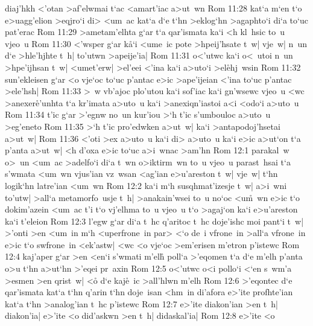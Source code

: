 diaj'hkh
<'otan
>af'elwmai
t`ac
<amart'iac
a>ut~wn\bibvsend
\vs Rom 11:28
kat`a
m`en
t`o
e>uagg'elion
>eqjro`i
di>
<um~ac
kat`a
d`e
t`hn
>eklog`hn
>agaphto`i
di`a
to`uc
pat'erac\bibvsend
\vs Rom 11:29
>ametam'elhta
g`ar
t`a
qar'ismata
ka`i
<h
kl~hsic
to~u
vjeo~u\bibvsend
\vs Rom 11:30
<'wsper
g`ar
k\r{a}`i
<ume~ic
pote
>hpeij'hsate
t~w|
vje~w|
n~un
d`e
>hle'hjhte
t~h|
to'utwn
>apeije'ia|\bibvsend
\vs Rom 11:31
o<'utwc
ka`i
o<~utoi
n~un
>hpe'ijhsan
t~w|
<umet'erw|
>el'eei
<'ina
ka`i
a>uto`i
>el\r{e}hj~wsin\bibvsend
{}
\vs Rom 11:32
sun'ekleisen
g`ar
<o
vje`oc
to`uc
p'antac
e>ic
>ape'ijeian
<'ina
to`uc
p'antac
>ele'hsh|\bibvsend
\vs Rom 11:33
>~w
vb'ajoc
plo'utou
ka`i
sof'iac
ka`i
gn'wsewc
vjeo~u
<wc
>anexer\r{e}'unhta
t`a
kr'imata
a>uto~u
ka`i
>anexiqn'iastoi
a<i
<odo`i
a>uto~u\bibvsend
\vs Rom 11:34
t'ic
g`ar
>'egnw
no~un
kur'iou
>`h
t'ic
s'umbouloc
a>uto~u
>eg'eneto\bibvsend
\vs Rom 11:35
>`h
t'ic
pro'edwken
a>ut~w|
ka`i
>antapodoj'hsetai
a>ut~w|\bibvsend
\vs Rom 11:36
<'oti
>ex
a>uto~u
ka`i
di>
a>uto~u
ka`i
e>ic
a>ut`on
t`a
p'anta
a>ut~w|
<h
d'oxa
e>ic
to`uc
a>i~wnac
>am'hn\bibvsend
\vs Rom 12:1
parakal~w
o>~un
<um~ac
>adelfo`i
di`a
t~wn
o>iktirm~wn
to~u
vjeo~u
parast~hsai
t`a
s'wmata
<um~wn
vjus'ian
vz~wsan
<ag'ian
e>u'areston
t~w|
vje~w|
t`hn
logik`hn
latre'ian
<um~wn\bibvsend
\vs Rom 12:2
ka`i
m`h
susqhmat'izesje
t~w|
a>i~wni
to'utw|
>all`a
metamorfo~usje
t~h|
>anakain'wsei
to~u
no`oc
<u\r{m}~wn
e>ic
t`o
dokim'azein
<um~ac
t'i
t`o
vj'elhma
to~u
vjeo~u
t`o
>agaj`on
ka`i
e>u'areston
ka`i
t'eleion\bibvsend
\vs Rom 12:3
l'egw
g`ar
di`a
t~hc
q'aritoc
t~hc
doje'ishc
moi
pant`i
t~w|
>'onti
>en
<um~in
m`h
<uperfrone~in
par>
<`o
de~i
vfrone~in
>all`a
vfrone~in
e>ic
t`o
swfrone~in
<ek'astw|
<wc
<o
vje`oc
>em'erisen
m'etron
p'istewc\bibvsend
\vs Rom 12:4
kaj'aper
g`ar
>en
<en`i
s'wmati
m'elh\r{}
poll`a
>'eqomen
t`a
d`e
m'elh
p'anta
o>u
t`hn
a>ut`hn
>'eqei
pr~axin\bibvsend
\vs Rom 12:5
o<'utwc
o<i
pollo`i
<`en
s~wm'a
>esmen
>en
qrist~w|
<o\r{}
d`e
kaj\r{e}~ic
>all'hlwn
m'elh\bibvsend
\vs Rom 12:6
>'eqontec
d`e
qar'ismata
kat`a
t`hn
q'arin
t`hn
doje~isan
<hm~in
di'afora
e>'ite
profhte'ian
kat`a
t`hn
>analog'ian
t~hc
p'istewc\bibvsend
\vs Rom 12:7
e>'ite
diakon'ian
>en
t~h|
diakon'ia|
e>'ite
<o
did'askwn
>en
t~h|
didaskal'ia|\bibvsend
\vs Rom 12:8
e>'ite
<o
